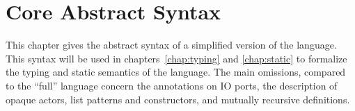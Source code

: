 
\chapter{Core Abstract Syntax}
\label{chap:abssyn}

\newcommand{\tm}[1]{\mathtt{#1}}
\newcommand{\ut}[1]{\emph{#1}}
\newcommand{\cat}[1]{\text{#1}}

This chapter gives the abstract syntax of a simplified version of the \hocl language.  This syntax
will be used in chapters~\ref{chap:typing} and \ref{chap:static} to formalize the typing and static
semantics of the language. The main omissions, compared to the ``full'' \hocl language concern
the annotations on IO ports,
the description of opaque actors,
list patterns and constructors,
and mutually recursive definitions.


